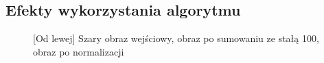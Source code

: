 \documentclass[a4paper,12pt, titlepage]{report}
\begin{document}
\subsection*{Efekty wykorzystania algorytmu}
\begin{figure}[h]
    \centering
    \caption{[Od lewej] Szary obraz wejściowy, obraz po sumowaniu ze stałą 100, obraz po normalizacji}%
    \label{fig:rysunek}%
\end{figure}
\FloatBarrier
\end{document}
